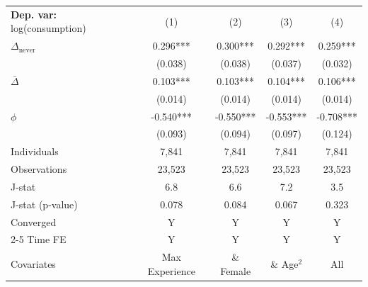 \begin{tabular}{l cccc} \toprule  \textbf{Dep. var:}  log(consumption) 
                    &\multicolumn{1}{c}{(1)}   &\multicolumn{1}{c}{(2)}   &\multicolumn{1}{c}{(3)}   &\multicolumn{1}{c}{(4)}   \\

\addlinespace
$\Delta_{\text{never}}$&       0.296***&       0.300***&       0.292***&       0.259***\\
                    &     (0.038)   &     (0.038)   &     (0.037)   &     (0.032)   \\

\addlinespace
$\bar{\Delta}$      &       0.103***&       0.103***&       0.104***&       0.106***\\
                    &     (0.014)   &     (0.014)   &     (0.014)   &     (0.014)   \\

\addlinespace
$\phi$              &      -0.540***&      -0.550***&      -0.553***&      -0.708***\\
                    &     (0.093)   &     (0.094)   &     (0.097)   &     (0.124)   \\
\addlinespace
Individuals         &       7,841   &       7,841   &       7,841   &       7,841   \\
Observations        &      23,523   &      23,523   &      23,523   &      23,523   \\
J-stat              &         6.8   &         6.6   &         7.2   &         3.5   \\
J-stat (p-value)    &       0.078   &       0.084   &       0.067   &       0.323   \\
Converged           &           Y   &           Y   &           Y   &           Y   \\
\cmidrule{2-5} Time FE & Y & Y & Y & Y \\ Covariates & Max Experience & \& Female & \& Age$^2$ & All \\ \bottomrule \end{tabular}
